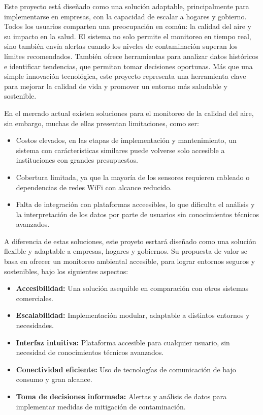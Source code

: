 \documentclass[
11pt, %
]{charter}
\begin{document}
Este proyecto está diseñado como una solución adaptable, principalmente para implementarse en empresas, con la capacidad de escalar a hogares y gobierno. Todos los usuarios comparten una preocupación en común: la calidad del aire y su impacto en la salud. El sistema no solo permite el monitoreo en tiempo real, sino también envía alertas cuando los niveles de contaminación superan los límites recomendados. También ofrece herramientas para analizar datos históricos e identificar tendencias, que permitan tomar decisiones oportunas. Más que una simple innovación tecnológica, este proyecto representa una herramienta clave para mejorar la calidad de vida y promover un entorno más saludable y sostenible.

En el mercado actual existen soluciones para el monitoreo de la calidad del aire, sin embargo, muchas de ellas presentan limitaciones, como ser:
\begin{itemize}
	\item Costos elevados, en las etapas de implementación y mantenimiento, un sistema con carácteristicas similares puede volverse solo accesible a instituciones con grandes presupuestos.
	\item Cobertura limitada, ya que la mayoría de los sensores requieren cableado o dependencias de redes WiFi con alcance reducido.
	\item Falta de integración con plataformas acceesibles, lo que dificulta el análisis y la interpretación de los datos por parte de usuarios sin conocimientos técnicos avanzados.
\end{itemize}

A diferencia de estas soluciones, este proyeto esrtará diseñado como una solución flexible y adaptable a  empresas, hogares y gobiernos. Su propuesta de valor se basa en ofrecer un monitoreo ambiental accesible, para lograr entornos seguros y sostenibles, bajo los siguientes aspectos:

\begin{itemize}
	\item \textbf{Accesibilidad:} Una solución asequible en comparación con otros sistemas comerciales.
	\item \textbf{Escalabilidad:} Implementación modular, adaptable a distintos entornos y necesidades.
	\item \textbf{Interfaz intuitiva:} Plataforma accesible para cualquier usuario, sin necesidad de conocimientos técnicos avanzados.
	\item \textbf{Conectividad eficiente:} Uso de tecnologías de comunicación de bajo consumo y gran alcance.
	\item \textbf{Toma de decisiones informada:} Alertas y análisis de datos para implementar medidas de mitigación de contaminación.
\end{itemize}
\end{document}
